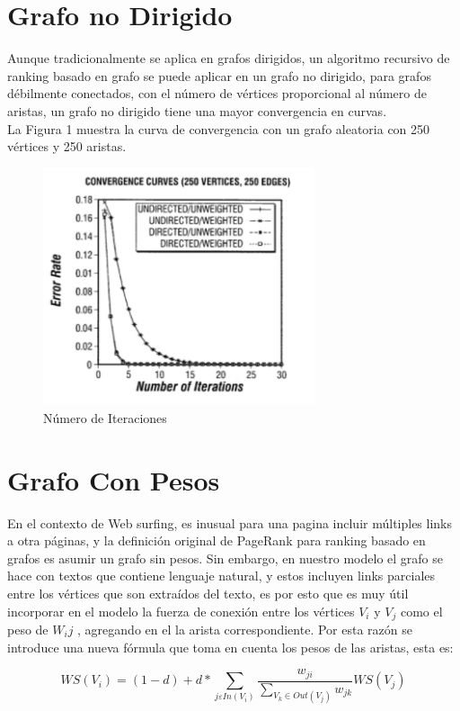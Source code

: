 \documentclass[conference]{IEEEtran}
\begin{document}
\section{Grafo no Dirigido}
Aunque tradicionalmente se aplica en grafos dirigidos, un algoritmo recursivo de ranking basado en grafo se puede aplicar en un grafo no dirigido, para grafos débilmente conectados, con el número de vértices proporcional al número de aristas, un grafo no dirigido tiene una mayor convergencia en curvas. \\
La Figura 1 muestra la curva de convergencia con un grafo aleatoria con 250 vértices y 250 aristas.
\begin{figure}
  \includegraphics[width=8cm]{figure1.png}
  \caption{Número de Iteraciones}
\end{figure}

\section{Grafo Con Pesos}
En el contexto de Web surfing, es inusual para una pagina incluir múltiples links a otra páginas, y la definición original de PageRank para ranking basado en grafos es asumir un grafo sin pesos.
Sin embargo, en nuestro modelo el grafo se hace con textos que contiene lenguaje natural, y estos incluyen links parciales entre los vértices que son extraídos del texto, es por esto que es muy útil incorporar en el modelo la fuerza de conexión entre los vértices $V_i$ y $V_j$ como el peso de $W_ij$ , agregando en el la arista correspondiente.
Por esta razón se introduce una nueva fórmula que toma en cuenta los pesos de las aristas, esta es:

$$WS(V_i) = (1-d)+d* \sum_{j\varepsilon In(V_i) }\frac{w_{ji}}{\sum_{V_k\in Out(V_j)}w_{jk}}WS(V_j)$$
\end{document}
